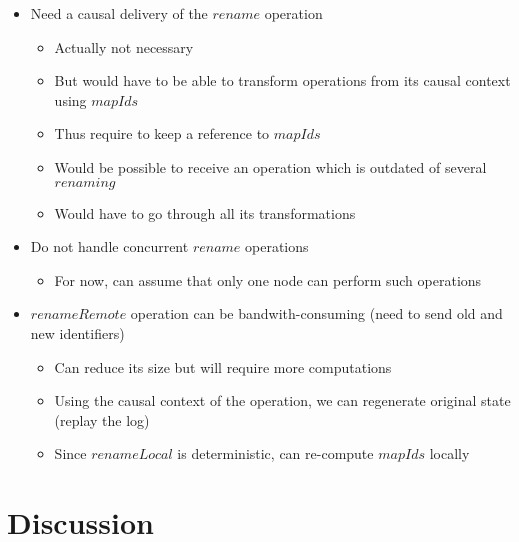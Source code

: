 \documentclass[a4paper]{article}
\begin{document}
\begin{itemize}
  \item Need a causal delivery of the $rename$ operation
  \begin{itemize}
    \item Actually not necessary
    \item But would have to be able to transform operations from its causal context using $mapIds$
    \item Thus require to keep a reference to $mapIds$
    \item Would be possible to receive an operation which is outdated of several $renaming$
    \item Would have to go through all its transformations
  \end{itemize}
  \item Do not handle concurrent $rename$ operations
  \begin{itemize}
    \item For now, can assume that only one node can perform such operations
  \end{itemize}
  \item $renameRemote$ operation can be bandwith-consuming (need to send old and new identifiers)
  \begin{itemize}
    \item Can reduce its size but will require more computations
    \item Using the causal context of the operation, we can regenerate original state (replay the log)
    \item Since $renameLocal$ is deterministic, can re-compute $mapIds$ locally
  \end{itemize}
\end{itemize}

\section{Discussion}
\end{document}
